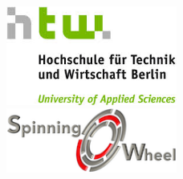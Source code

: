 \documentclass[a4paper,11pt,oneside,%
headsepline,												%
footsepline,												%
bibtotocnumbered									%
]{scrreprt}
\begin{document}


\begin{titlepage}
	\begin{center}
		\begin{figure}[!htb]
				\begin{center}
			  		\includegraphics[width=0.5\textwidth]{bilder/htwLogo.jpeg}
				\end{center}
			\endminipage\hfill
				\begin{center}
			 		\includegraphics[width=0.5\textwidth]{bilder/Spinning_O_Wheel-200.png}
				\end{center}	
			\endminipage
		\end{figure}
	

\end{center}
\end{titlepage}
\end{document}
